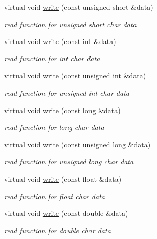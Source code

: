 \begin{DoxyCompactItemize}
virtual void \hyperlink{class_magnum_1_1_output_stream_aaaa0e1f1d4e06cab696fdd5b68a7e63c}{write} (const unsigned short \&data)
\begin{DoxyCompactList}\small\item\em read function for unsigned short char data \end{DoxyCompactList}\item 
virtual void \hyperlink{class_magnum_1_1_output_stream_a6ab73ae4cd180757f6ba3db92bad567f}{write} (const int \&data)
\begin{DoxyCompactList}\small\item\em read function for int char data \end{DoxyCompactList}\item 
virtual void \hyperlink{class_magnum_1_1_output_stream_a89b26b143d0b82f63f58377aaab2c114}{write} (const unsigned int \&data)
\begin{DoxyCompactList}\small\item\em read function for unsigned int char data \end{DoxyCompactList}\item 
virtual void \hyperlink{class_magnum_1_1_output_stream_ab284b427000c1a7194ce4b611869d8be}{write} (const long \&data)
\begin{DoxyCompactList}\small\item\em read function for long char data \end{DoxyCompactList}\item 
virtual void \hyperlink{class_magnum_1_1_output_stream_aa586f0b458bbbb573f9a70deafa1ccf9}{write} (const unsigned long \&data)
\begin{DoxyCompactList}\small\item\em read function for unsigned long char data \end{DoxyCompactList}\item 
virtual void \hyperlink{class_magnum_1_1_output_stream_af32427b66a2a97f456fbeac50ef6f054}{write} (const float \&data)
\begin{DoxyCompactList}\small\item\em read function for float char data \end{DoxyCompactList}\item 
virtual void \hyperlink{class_magnum_1_1_output_stream_a135990726070a396ae461bd8cba59cb8}{write} (const double \&data)
\begin{DoxyCompactList}\small\item\em read function for double char data \end{DoxyCompactList}\item 

\end{DoxyCompactItemize}
